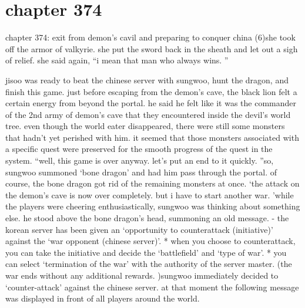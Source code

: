 \section{chapter 374}

chapter 374: exit from demon’s cavil and preparing to conquer china (6)she took off the armor of valkyrie.
 she put the sword back in the sheath and let out a sigh of relief.
 she said again, “i mean that man who always wins.
”




jisoo was ready to beat the chinese server with sungwoo, hunt the dragon, and finish this game.
just before escaping from the demon’s cave, the black lion felt a certain energy from beyond the portal.
 he said he felt like it was the commander of the 2nd army of demon’s cave that they encountered inside the devil’s world tree.
even though the world eater disappeared, there were still some monsters that hadn’t yet perished with him.
 it seemed that those monsters associated with a specific quest were preserved for the smooth progress of the quest in the system.
“well, this game is over anyway.
 let’s put an end to it quickly.
”so, sungwoo summoned ‘bone dragon’ and had him pass through the portal.
 of course, the bone dragon got rid of the remaining monsters at once.
‘the attack on the demon’s cave is now over completely.
 but i have to start another war.
’while the players were cheering enthusiastically, sungwoo was thinking about something else.
 he stood above the bone dragon’s head, summoning an old message.
- the korean server has been given an ‘opportunity to counterattack (initiative)’ against the ‘war opponent (chinese server)’.
* when you choose to counterattack, you can take the initiative and decide the ‘battlefield’ and ‘type of war’.
* you can select ‘termination of the war’ with the authority of the server master.
 (the war ends without any additional rewards.
)sungwoo immediately decided to ‘counter-attack’ against the chinese server.
at that moment the following message was displayed in front of all players around the world.

